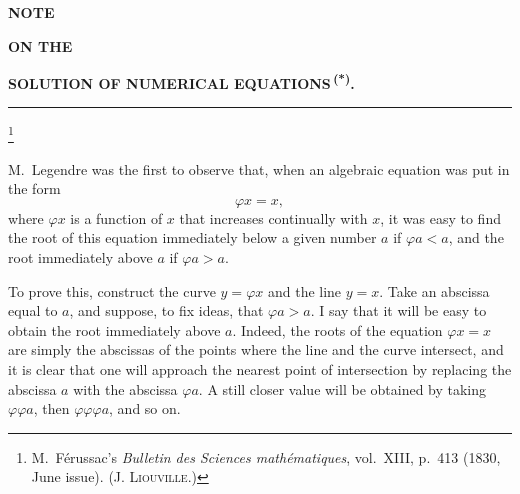 
\providecommand{\GalSourcePageStart}[4]{}%
\providecommand{\GalSourcePageBoundary}[4]{\space}%
\providecommand{\GalSourceError}[2]{#1}%
\providecommand{\GalHistoricalFootnote}[1]{\footnote{#1}}%
\providecommand{\GalArticleEndRule}{\par\smallskip\begin{center}\rule{0.18\linewidth}{0.4pt}\end{center}}%

\GalSourcePageStart{042}{L0041}{13}{13}

\begin{center}
{\Large\bfseries NOTE\par}
\vspace{0.15em}
{\scriptsize\bfseries ON THE\par}
\vspace{0.18em}
{\normalsize\bfseries SOLUTION OF NUMERICAL EQUATIONS\,\textsuperscript{(*)}.\par}
\vspace{0.7em}
\rule{0.12\linewidth}{0.4pt}
\end{center}

\GalHistoricalFootnote{M.~Férussac's \emph{Bulletin des Sciences mathématiques}, vol.~XIII,
p.~413 (1830, June issue). \textsc{(J. Liouville.)}}

M.~Legendre was the first to observe that, when an algebraic equation
was put in the form
\[
\varphi x=x,
\]
where $\varphi x$ is a function of $x$ that increases continually with
$x$, it was easy to find the root of this equation immediately below
a given number $a$ if $\varphi a<a$, and the root immediately above $a$
if $\varphi a>a$.

To prove this, construct the curve $y=\varphi x$ and the line $y=x$.
Take an abscissa equal to $a$, and suppose, to fix ideas, that
$\varphi a>a$. I say that it will be easy to obtain the root immediately
above $a$. Indeed, the roots of the equation $\varphi x=x$ are simply
the abscissas of the points where the line and the curve intersect, and
it is clear that one will approach the nearest point of intersection by
replacing the abscissa $a$ with the abscissa $\varphi a$. A still closer
value will be obtained by taking $\varphi\varphi a$, then
$\varphi\varphi\varphi a$, and so on.

